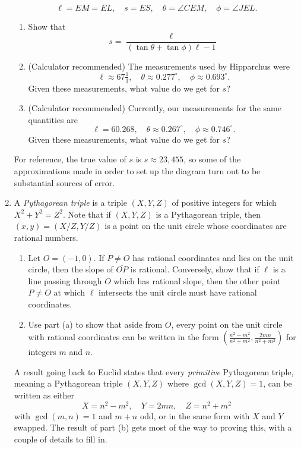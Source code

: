 \begin{enumerate}
\begin{equation*}
\ell = EM = EL,\quad s = ES,\quad\theta = \angle CEM,\quad\phi = \angle JEL.
\end{equation*}
\begin{enumerate}
\item Show that 
\begin{equation*}
s = \frac{\ell}{(\tan\theta + \tan\phi)\ell - 1}
\end{equation*}
\item (Calculator recommended) The measurements used by Hipparchus were
\begin{equation*}
\ell\approx 67\tfrac{1}{3},\quad\theta\approx 0.277^{\circ},\quad\phi\approx 0.693^{\circ}.
\end{equation*}
Given these measurements, what value do we get for $s$?
\item (Calculator recommended) Currently, our measurements for the same quantities are
\begin{equation*}
\ell = 60.268,\quad\theta\approx 0.267^{\circ},\quad\phi\approx 0.746^{\circ}.
\end{equation*}
Given these measurements, what value do we get for $s$?\par
\end{enumerate}
For reference, the true value of $s$ is $s\approx 23{,}455$, so some of the approximations made in order to set up the diagram turn out to be substantial sources of error.\newpage
\item A \emph{Pythagorean triple} is a triple $(X,Y,Z)$ of positive integers for which $X^2 + Y^2 = Z^2$. Note that if $(X,Y,Z)$ is a Pythagorean triple, then $(x,y) = (X/Z, Y/Z)$ is a point on the unit circle whose coordinates are rational numbers.
\begin{enumerate}
\item Let $O = (-1,0)$. If $P\neq O$ has rational coordinates and lies on the unit circle, then the slope of $\overline{OP}$ is rational. Conversely, show that if $\ell$ is a line passing through $O$ which has rational slope, then the other point $P\neq O$ at which $\ell$ intersects the unit circle must have rational coordinates.
\item Use part (a) to show that aside from $O$, every point on the unit circle with rational coordinates can be written in the form $\displaystyle\left(\frac{n^2 - m^2}{n^2 + m^2}, \frac{2mn}{n^2 + m^2}\right)$ for integers $m$ and $n$.
\end{enumerate}
A result going back to Euclid states that every \emph{primitive} Pythagorean triple, meaning a Pythagorean triple $(X,Y,Z)$ where $\gcd(X,Y,Z) = 1$, can be written as either
\begin{equation*}
X = n^2 - m^2,\quad Y = 2mn,\quad Z = n^2 + m^2
\end{equation*}
with $\gcd(m,n) = 1$ and $m + n$ odd, or in the same form with $X$ and $Y$ swapped. The result of part (b) gets most of the way to proving this, with a couple of details to fill in.
\end{enumerate}


